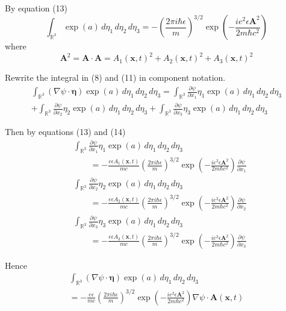 \documentclass[12pt]{article}
\begin{document}
By equation (13)
\begin{equation*}
\int_{\mathbb R^3}
\exp(a)\,d\eta_1\,d\eta_2\,d\eta_3
=-\left(\frac{2\pi i\hbar\epsilon}{m}\right)^{3/2}
\exp\left(-\frac{ie^2\epsilon\mathbf A^2}{2m\hbar c^2}\right)
\tag{16}
\end{equation*}
where
\begin{equation*}
\mathbf A^2=\mathbf A\cdot\mathbf A=A_1(\mathbf x,t)^2+A_2(\mathbf x,t)^2+A_3(\mathbf x,t)^2
\end{equation*}

Rewrite the integral in (8) and (11) in component notation.
\begin{multline*}
\int_{\mathbb R^3}
(\nabla\psi\cdot\boldsymbol\eta)
\exp(a)\,d\eta_1\,d\eta_2\,d\eta_3
=\int_{\mathbb R^3}
\frac{\partial\psi}{\partial x_1}
\eta_1\exp(a)
\,d\eta_1\,d\eta_2\,d\eta_3
\\
+\int_{\mathbb R^3}
\frac{\partial\psi}{\partial x_2}
\eta_2\exp(a)\,d\eta_1\,d\eta_2\,d\eta_3
+\int_{\mathbb R^3}
\frac{\partial\psi}{\partial x_3}
\eta_3\exp(a)\,d\eta_1\,d\eta_2\,d\eta_3
\end{multline*}

Then by equations (13) and (14)
\begin{align*}
&\int_{\mathbb R^3}
\frac{\partial\psi}{\partial x_1}
\eta_1\exp(a)\,d\eta_1\,d\eta_2\,d\eta_3
\\
&\qquad{}=-\frac{e\epsilon A_1(\mathbf x,t)}{mc}
\left(\frac{2\pi i\hbar\epsilon}{m}\right)^{3/2}
\exp\left(-\frac{ie^2\epsilon\mathbf A^2}{2m\hbar c^2}\right)
\frac{\partial\psi}{\partial x_1}
\\
&\int_{\mathbb R^3}
\frac{\partial\psi}{\partial x_2}
\eta_2\exp(a)\,d\eta_1\,d\eta_2\,d\eta_3
\\
&\qquad{}=-\frac{e\epsilon A_2(\mathbf x,t)}{mc}
\left(\frac{2\pi i\hbar\epsilon}{m}\right)^{3/2}
\exp\left(-\frac{ie^2\epsilon\mathbf A^2}{2m\hbar c^2}\right)
\frac{\partial\psi}{\partial x_2}
\\
&\int_{\mathbb R^3}
\frac{\partial\psi}{\partial x_3}
\eta_3\exp(a)\,d\eta_1\,d\eta_2\,d\eta_3
\\
&\qquad{}=-\frac{e\epsilon A_3(\mathbf x,t)}{mc}
\left(\frac{2\pi i\hbar\epsilon}{m}\right)^{3/2}
\exp\left(-\frac{ie^2\epsilon\mathbf A^2}{2m\hbar c^2}\right)
\frac{\partial\psi}{\partial x_3}
\end{align*}

Hence
\begin{multline*}
\int_{\mathbb R^3}
(\nabla\psi\cdot\boldsymbol\eta)
\exp(a)\,d\eta_1\,d\eta_2\,d\eta_3
\\
{}=
-\frac{e\epsilon}{mc}
\left(\frac{2\pi i\hbar\epsilon}{m}\right)^{3/2}
\exp\left(-\frac{ie^2\epsilon\mathbf A^2}{2m\hbar c^2}\right)
\nabla\psi\cdot\mathbf A(\mathbf x,t)
\tag{17}
\end{multline*}
\end{document}
